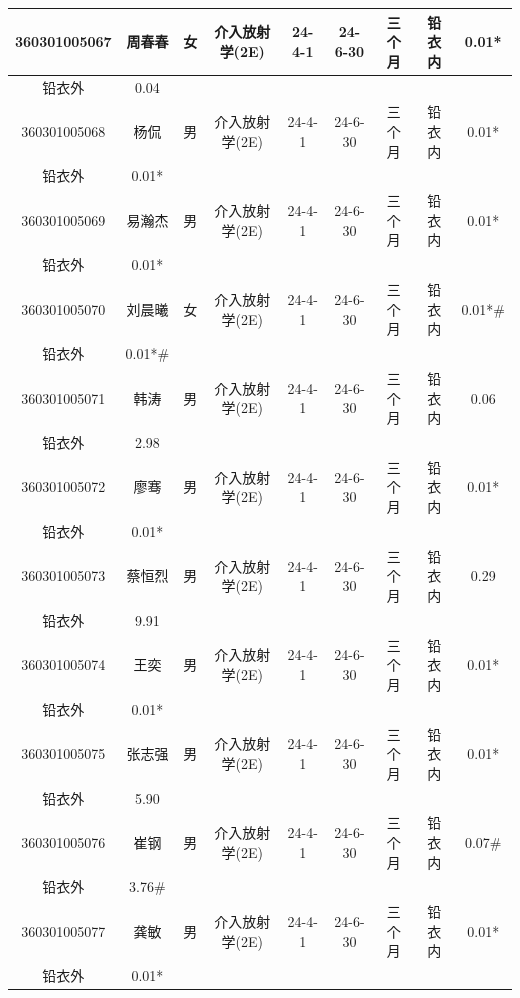 \begin{table}[H]
\centering
\begin{tabular}{|c|c|c|c|c|c|c|c|c|}
\hline
360301005067 & 周春春 & 女 & 介入放射学(2E) & 24-4-1 & 24-6-30 & 三个月 & 铅衣内 & 0.01* \\
\hline
铅衣外 & 0.04 &  &  &  &  &  &  &  \\
\hline
360301005068 & 杨侃 & 男 & 介入放射学(2E) & 24-4-1 & 24-6-30 & 三个月 & 铅衣内 & 0.01* \\
\hline
铅衣外 & 0.01* &  &  &  &  &  &  &  \\
\hline
360301005069 & 易瀚杰 & 男 & 介入放射学(2E) & 24-4-1 & 24-6-30 & 三个月 & 铅衣内 & 0.01* \\
\hline
铅衣外 & 0.01* &  &  &  &  &  &  &  \\
\hline
360301005070 & 刘晨曦 & 女 & 介入放射学(2E) & 24-4-1 & 24-6-30 & 三个月 & 铅衣内 & 0.01*\# \\
\hline
铅衣外 & 0.01*\# &  &  &  &  &  &  &  \\
\hline
360301005071 & 韩涛 & 男 & 介入放射学(2E) & 24-4-1 & 24-6-30 & 三个月 & 铅衣内 & 0.06 \\
\hline
铅衣外 & 2.98 &  &  &  &  &  &  &  \\
\hline
360301005072 & 廖骞 & 男 & 介入放射学(2E) & 24-4-1 & 24-6-30 & 三个月 & 铅衣内 & 0.01* \\
\hline
铅衣外 & 0.01* &  &  &  &  &  &  &  \\
\hline
360301005073 & 蔡恒烈 & 男 & 介入放射学(2E) & 24-4-1 & 24-6-30 & 三个月 & 铅衣内 & 0.29 \\
\hline
铅衣外 & 9.91 &  &  &  &  &  &  &  \\
\hline
360301005074 & 王奕 & 男 & 介入放射学(2E) & 24-4-1 & 24-6-30 & 三个月 & 铅衣内 & 0.01* \\
\hline
铅衣外 & 0.01* &  &  &  &  &  &  &  \\
\hline
360301005075 & 张志强 & 男 & 介入放射学(2E) & 24-4-1 & 24-6-30 & 三个月 & 铅衣内 & 0.01* \\
\hline
铅衣外 & 5.90 &  &  &  &  &  &  &  \\
\hline
360301005076 & 崔钢 & 男 & 介入放射学(2E) & 24-4-1 & 24-6-30 & 三个月 & 铅衣内 & 0.07\# \\
\hline
铅衣外 & 3.76\# &  &  &  &  &  &  &  \\
\hline
360301005077 & 龚敏 & 男 & 介入放射学(2E) & 24-4-1 & 24-6-30 & 三个月 & 铅衣内 & 0.01* \\
\hline
铅衣外 & 0.01* &  &  &  &  &  &  &  \\

\end{tabular}
\end{table}
